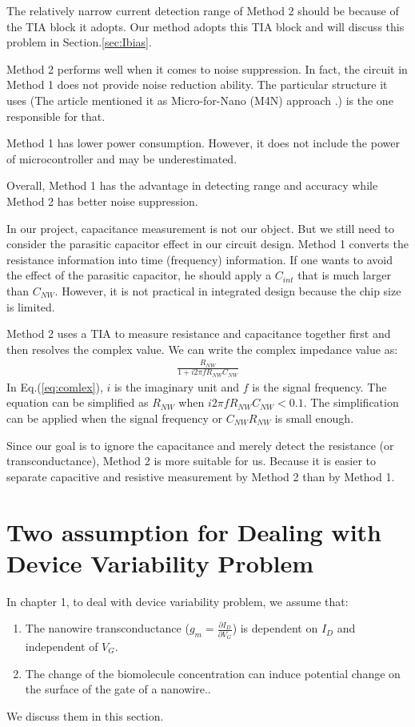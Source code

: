 The relatively narrow current detection range of Method 2 should be because of the TIA block it adopts.
Our method adopts this TIA block and will discuss this problem in Section.\ref{sec:Ibias}.

Method 2 performs well when it comes to noise suppression.
In fact, the circuit in Method 1 does not provide noise reduction ability.
The particular structure it uses (The article \cite{Juv1} mentioned it as Micro-for-Nano (M4N) approach \cite{M4N}.) is the one responsible for that.

Method 1 has lower power consumption. However, it does not include the power of microcontroller and may be underestimated.

Overall, Method 1 has the advantage in detecting range and accuracy while Method 2 has better noise suppression.

In our project, capacitance measurement is not our object.
But we still need to consider the parasitic capacitor effect in our circuit design.
Method 1 converts the resistance information into time (frequency) information.
If one wants to avoid the effect of the parasitic capacitor, he should apply a $C_{int}$ that is much larger than $C_{NW}$.
However, it is not practical in integrated design because the chip size is limited.

Method 2 uses a TIA to measure resistance and capacitance together first and then resolves the complex value.
We can write the complex impedance value as:
\begin{align}
      \frac{R_{NW}}{1 + i2\pi f R_{NW} C_{NW}} \label{eq:comlex}
\end{align}
In Eq.(\ref{eq:comlex}), $i$ is the imaginary unit and $f$ is the signal frequency.
The equation can be simplified as $R_{NW}$ when $i2\pi f R_{NW} C_{NW} < 0.1$.
The simplification can be applied when the signal frequency or $C_{NW} R_{NW}$ is small enough.

Since our goal is to ignore the capacitance and merely detect the resistance (or transconductance), Method 2 is more suitable for us.
Because it is easier to separate capacitive and resistive measurement by Method 2 than by Method 1.







\section{Two assumption for Dealing with Device Variability Problem} \label{sec:assumpDiscuss}
In chapter 1, to deal with device variability problem, we assume that:
\begin{enumerate}
    \item The nanowire transconductance ($g_m = \frac{\partial I_D}{\partial V_{G}}$) is dependent on $I_D$ and independent of $V_{G}$.
    \item The change of the biomolecule concentration can induce potential change on the surface of the gate of a nanowire..
\end{enumerate}
We discuss them in this section.

